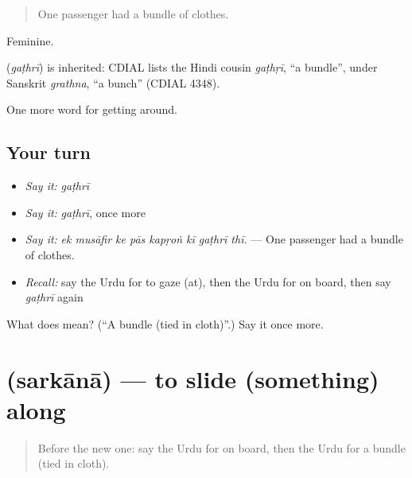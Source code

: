 \begin{quote}
One passenger had a bundle of clothes.
\end{quote}

Feminine.

\begin{cousinweb}
\textbf{} (\emph{gaṭhrī}) is inherited: CDIAL lists the Hindi cousin \emph{gaṭhṛī}, \textquotedblleft{}a bundle\textquotedblright{}, under Sanskrit \emph{grathna}, \textquotedblleft{}a bunch\textquotedblright{} (CDIAL 4348).
\end{cousinweb}

\begin{grammarlens}[title={What you've built}]
One more word for getting around.
\end{grammarlens}

\subsection*{Your turn}
\begin{itemize}
\raggedright
  \item \emph{Say it:} \emph{gaṭhrī}
  \item \emph{Say it:} \emph{gaṭhrī}, once more
  \item \emph{Say it:} \emph{ek musāfir ke pās kapṛoṅ kī gaṭhrī thī.} — One passenger had a bundle of clothes.
  \item \emph{Recall:} say the Urdu for to gaze (at), then the Urdu for on board, then say \emph{gaṭhrī} again
\end{itemize}

\begin{tcolorbox}[breakable,colback=teal!4,colframe=teal!35!black,title={Before you move on}]
What does  mean? (\textquotedblleft{}A bundle (tied in cloth)\textquotedblright{}.) Say it once more.
\end{tcolorbox}
\section[\texorpdfstring{\ur{سرکانا} (sarkānā)}{سرکانا (sarkānā)}]{ (sarkānā) — to slide (something) along}

\label{lesson:UR-C389-sarkana}



\begin{quote}
Before the new one: say the Urdu for on board, then the Urdu for a bundle (tied in cloth).
\end{quote}

